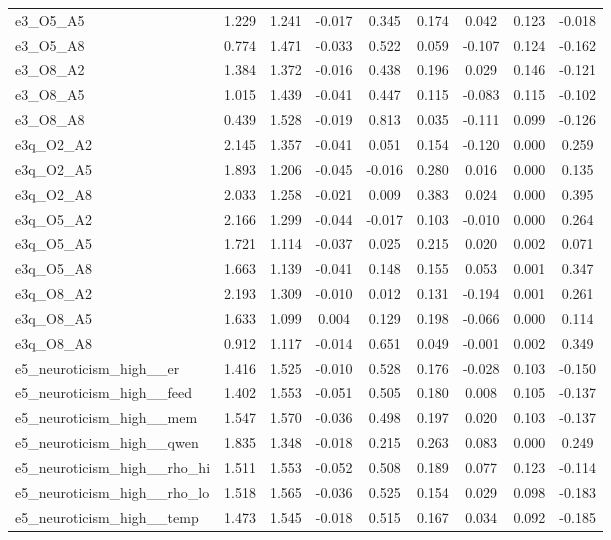\documentclass[11pt]{article}
\begin{document}
\begin{longtable}{lcccccccc}
e3\_O5\_A5 & 1.229 & 1.241 & -0.017 & 0.345 & 0.174 & 0.042 & 0.123 & -0.018 \\
e3\_O5\_A8 & 0.774 & 1.471 & -0.033 & 0.522 & 0.059 & -0.107 & 0.124 & -0.162 \\
e3\_O8\_A2 & 1.384 & 1.372 & -0.016 & 0.438 & 0.196 & 0.029 & 0.146 & -0.121 \\
e3\_O8\_A5 & 1.015 & 1.439 & -0.041 & 0.447 & 0.115 & -0.083 & 0.115 & -0.102 \\
e3\_O8\_A8 & 0.439 & 1.528 & -0.019 & 0.813 & 0.035 & -0.111 & 0.099 & -0.126 \\
e3q\_O2\_A2 & 2.145 & 1.357 & -0.041 & 0.051 & 0.154 & -0.120 & 0.000 & 0.259 \\
e3q\_O2\_A5 & 1.893 & 1.206 & -0.045 & -0.016 & 0.280 & 0.016 & 0.000 & 0.135 \\
e3q\_O2\_A8 & 2.033 & 1.258 & -0.021 & 0.009 & 0.383 & 0.024 & 0.000 & 0.395 \\
e3q\_O5\_A2 & 2.166 & 1.299 & -0.044 & -0.017 & 0.103 & -0.010 & 0.000 & 0.264 \\
e3q\_O5\_A5 & 1.721 & 1.114 & -0.037 & 0.025 & 0.215 & 0.020 & 0.002 & 0.071 \\
e3q\_O5\_A8 & 1.663 & 1.139 & -0.041 & 0.148 & 0.155 & 0.053 & 0.001 & 0.347 \\
e3q\_O8\_A2 & 2.193 & 1.309 & -0.010 & 0.012 & 0.131 & -0.194 & 0.001 & 0.261 \\
e3q\_O8\_A5 & 1.633 & 1.099 & 0.004 & 0.129 & 0.198 & -0.066 & 0.000 & 0.114 \\
e3q\_O8\_A8 & 0.912 & 1.117 & -0.014 & 0.651 & 0.049 & -0.001 & 0.002 & 0.349 \\
e5\_neuroticism\_high\_\_er & 1.416 & 1.525 & -0.010 & 0.528 & 0.176 & -0.028 & 0.103 & -0.150 \\
e5\_neuroticism\_high\_\_feed & 1.402 & 1.553 & -0.051 & 0.505 & 0.180 & 0.008 & 0.105 & -0.137 \\
e5\_neuroticism\_high\_\_mem & 1.547 & 1.570 & -0.036 & 0.498 & 0.197 & 0.020 & 0.103 & -0.137 \\
e5\_neuroticism\_high\_\_qwen & 1.835 & 1.348 & -0.018 & 0.215 & 0.263 & 0.083 & 0.000 & 0.249 \\
e5\_neuroticism\_high\_\_rho\_hi & 1.511 & 1.553 & -0.052 & 0.508 & 0.189 & 0.077 & 0.123 & -0.114 \\
e5\_neuroticism\_high\_\_rho\_lo & 1.518 & 1.565 & -0.036 & 0.525 & 0.154 & 0.029 & 0.098 & -0.183 \\
e5\_neuroticism\_high\_\_temp & 1.473 & 1.545 & -0.018 & 0.515 & 0.167 & 0.034 & 0.092 & -0.185 \\

\end{longtable}
\end{document}
